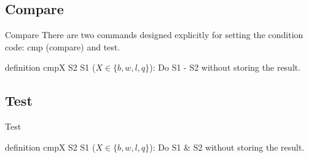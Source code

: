 \documentclass{beamer}
\newtheorem{rmk}{Remark}
\begin{document}
        \subsection{Compare}
        \begin{frame}{Compare}
            There are two commands designed explicitly for setting the condition code: cmp (compare) and test.
            \begin{block}{definition}
                cmpX S2 S1 ($X \in \{b, w, l, q\}$): Do S1 - S2 without storing the result.
            \end{block}
        \end{frame}
        \subsection{Test}
        \begin{frame}{Test}
            \begin{block}{definition}
                cmpX S2 S1 ($X \in \{b, w, l, q\}$): Do S1 \& S2 without storing the result.
            \end{block}
        \end{frame}
\end{document}
